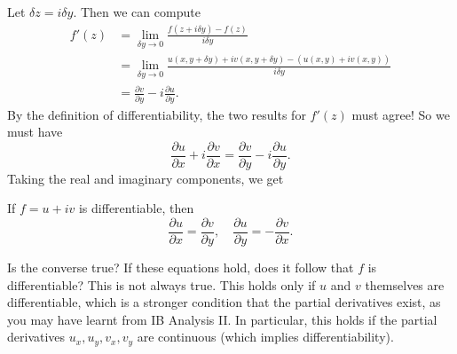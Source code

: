 \documentclass[a4paper]{article}
\begin{document}
Let $\delta z = i \delta y$. Then we can compute
\begin{align*}
  f'(z) &= \lim_{\delta y \to 0} \frac{f(z + i\delta y) - f(z)}{i \delta y}\\
  &= \lim_{\delta y \to 0} \frac{u(x, y + \delta y) + iv(x, y + \delta y) - (u(x, y) + iv(x, y))}{i \delta y}\\
  &= \frac{\partial v}{\partial y} - i \frac{\partial u}{\partial y}.
\end{align*}
By the definition of differentiability, the two results for $f'(z)$ must agree! So we must have
\[
  \frac{\partial u}{\partial x} + i \frac{\partial v}{\partial x} = \frac{\partial v}{\partial y} - i \frac{\partial u}{\partial y}.
\]
Taking the real and imaginary components, we get
\begin{prop}
  If $f = u + iv$ is differentiable, then
  \[
    \frac{\partial u}{\partial x} = \frac{\partial v}{\partial y},\quad \frac{\partial u}{\partial y} = -\frac{\partial v}{\partial x}.
  \]
\end{prop}
Is the converse true? If these equations hold, does it follow that $f$ is differentiable? This is not always true. This holds only if $u$ and $v$ themselves are differentiable, which is a stronger condition that the partial derivatives exist, as you may have learnt from IB Analysis II. In particular, this holds if the partial derivatives $u_x, u_y, v_x, v_y$ are continuous (which implies differentiability).
\end{document}
